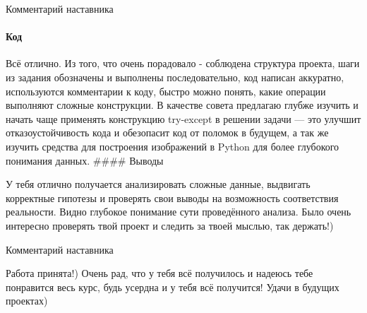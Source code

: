 \documentclass[11pt]{article}
\newcommand{\prompt}[4]{
        \llap{{\color{#2}[#3]: #4}}\vspace{-1.25em}
    }
\begin{document}
    Комментарий наставника

\hypertarget{ux43aux43eux434}{%
\paragraph{Код}\label{ux43aux43eux434}}

Всё отлично. Из того, что очень порадовало - соблюдена структура
проекта, шаги из задания обозначены и выполнены последовательно, код
написан аккуратно, используются комментарии к коду, быстро можно понять,
какие операции выполняют сложные конструкции. В качестве совета
предлагаю глубже изучить и начать чаще применять конструкцию try-except
в решении задачи --- это улучшит отказоустойчивость кода и обезопасит
код от поломок в будущем, а так же изучить средства для построения
изображений в Python для более глубокого понимания данных. \#\#\#\#
Выводы

У тебя отлично получается анализировать сложные данные, выдвигать
корректные гипотезы и проверять свои выводы на возможность соответствия
реальности. Видно глубокое понимание сути проведённого анализа. Было
очень интересно проверять твой проект и следить за твоей мыслью, так
держать!)

    Комментарий наставника

Работа принята!) Очень рад, что у тебя всё получилось и надеюсь тебе
понравится весь курс, будь усердна и у тебя всё получится! Удачи в
будущих проектах)

    \begin{tcolorbox}[breakable, size=fbox, boxrule=1pt, pad at break*=1mm,colback=cellbackground, colframe=cellborder]
\prompt{In}{incolor}{ }{\hspace{4pt}}
\begin{Verbatim}[commandchars=\\\{\}]

\end{Verbatim}
\end{tcolorbox}


    
    
    
    
\end{document}
